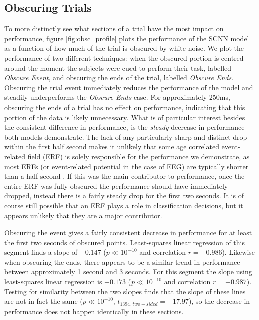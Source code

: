 \documentclass[fleqn,10pt]{wlscirep}
\begin{document}
\subsection*{Obscuring Trials}

To more distinctly see what sections of a trial have the most impact on performance, figure \ref{fig:obsc_profile} plots the performance of the SCNN model as a function of how much of the trial is obscured by white noise. We plot the performance of two different techniques: when the obscured portion is centred around the moment the subjects were cued to perform their task, labelled {\em Obscure Event}, and obscuring the ends of the trial, labelled {\em Obscure Ends}. Obscuring the trial event immediately reduces the performance of the model and steadily underperforms the {\em Obscure Ends} case. For approximately 250ms, obscuring the ends of a trial has no effect on performance, indicating that this portion of the data is likely unnecessary. What is of particular interest besides the consistent difference in performance, is the {\em steady} decrease in performance both models demonstrate. The lack of any particularly sharp and distinct drop within the first half second makes it unlikely that some age correlated event-related field (ERF) is solely responsible for the performance we demonstrate, as most ERFs (or event-related potential in the case of EEG) are typically shorter than a half-second \cite{ElectricFieldsOfTheBrain}. If this was the main contributor to performance, once the entire ERF was fully obscured the performance should have immediately dropped, instead there is a fairly steady drop for the first two seconds. It is of course still possible that an ERF plays a role in classification decisions, but it appears unlikely that they are a major contributor.

Obscuring the event gives a fairly consistent decrease in performance for at least the first two seconds of obscured points. Least-squares linear regression of this segment finds a slope of $-0.147$ ($p \ll 10^{-10}$ and correlation $r=-0.986$). Likewise when obscuring the ends, there appears to be a similar trend in performance between approximately 1 second and 3 seconds. For this segment the slope using least-squares linear regression is $-0.173$ ($p \ll 10^{-10}$ and correlation $r=-0.987$). Testing for similarity between the two slopes finds that the slope of these lines are not in fact the same ($p \ll 10^{-10}$, $t_{1394, two-sided}=-17.97$), so the decrease in performance does not happen identically in these sections.
\end{document}
